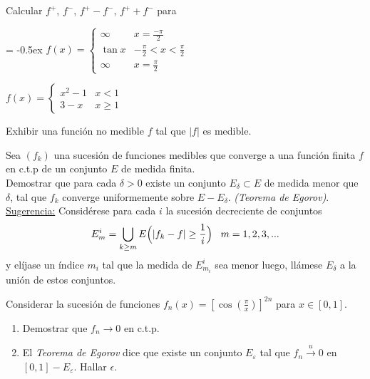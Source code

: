 \documentclass{book}
\begin{document}
\begin{ejer}{} 
Calcular $f^+$, $f^-$, $f^+-f^-$, $f^{+} + f^-$ para
\begin{enumerate}
\item 
{
\extrarowheight = -0.5ex
\renewcommand{\arraystretch}{1.5}
$f(x)=\left\{
\begin{array}{lc}
\infty&x=\frac{-\pi}{2}
\\
\tan x &-\frac{\pi}{2}<x<\frac{\pi}{2}
\\
\infty&x=\frac{\pi}{2}
\end{array}
\right.$
\item $f(x)=\left\{
\begin{array}{ll}
x^2-1&x<1
\\
3-x&x\geq 1
\end{array}
\right.$}
\end{enumerate}
\end{ejer}




\begin{ejer}{} 
Exhibir una función no medible $f$ tal que $|f|$ es medible.
\end{ejer}




\begin{ejer}{} 
Sea $(f_k)$ una sucesión de  funciones medibles que converge a una función finita $f$
en c.t.p de un conjunto $E$ de medida finita. 
\\
Demostrar que para cada $\delta>0$  existe un conjunto
$E_{\delta}\subset E$ de medida menor que $\delta$, tal que $f_k$ converge uniformemente sobre 
$E-E_{\delta}$. 
{\it{(Teorema de Egorov)}}.
\\
\underline{Sugerencia:} Considérese para cada $i$ la 
sucesión decreciente de conjuntos
$$E_m^i=\bigcup_{k\geq m}E\Bigl(|f_k-f|\geq \frac{1}{i}\Bigr) \;\;\;m=1,2,3,...$$
y elíjase un índice $m_i$ tal que la medida de $E_{m_i}^i$ sea menor luego, llámese $E_{\delta}$ a la unión de estos conjuntos.
\end{ejer} 

\begin{ejer}{} 
Considerar la sucesi\'on de funciones $f_n(x)=[\cos(\frac{\pi}{x})]^{2n}$ para $x \in [0,1]$.
\begin{enumerate}
\item Demostrar que $f_n \to 0$ en c.t.p.
\item El \textit{Teorema de Egorov} dice que existe un conjunto $E_{\varepsilon}$ tal que $f_n \xrightarrow{u} 0$
en $[0,1]-E_{\varepsilon}$. 
Hallar $\epsilon$.
\end{enumerate}
\end{ejer}
\end{document}
